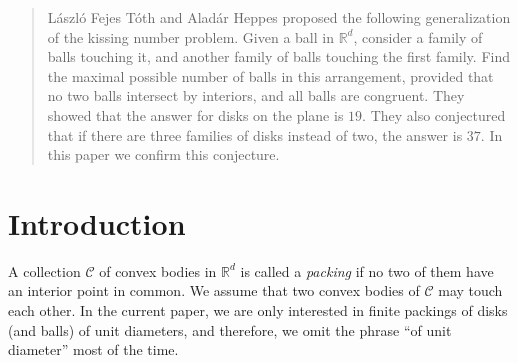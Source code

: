 \begin{abstract}
    L\'{a}szl\'{o} Fejes T\'{o}th and Alad\'{a}r Heppes proposed the following generalization of the kissing number problem. Given a ball in $\mathbb{R}^d$, consider a family of balls touching it, and another family of balls touching the first family. Find the maximal possible number of balls in this arrangement, provided that no two balls intersect by interiors, and all balls are congruent. They showed that the answer for disks on the plane is $19$. They also conjectured that if there are three families of disks instead of two, the answer is $37$. In this paper we confirm this conjecture.
\end{abstract}

\section{Introduction}

A collection $\mathcal C$ of convex bodies in $\mathbb R^d$ is called a \emph{packing} if no two of them have an interior point in common. We assume that two convex bodies of $\mathcal{C}$ may touch each other. %
In the current paper, we are only interested in finite packings of disks (and balls) of unit diameters, and therefore, we omit the phrase ``of unit diameter'' most of the time.




